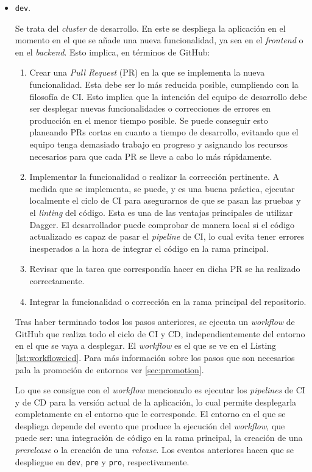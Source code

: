 \begin{itemize}
  \item \texttt{dev}.

    Se trata del \textit{cluster} de desarrollo. En este se despliega la aplicación en el momento en el que se añade una nueva funcionalidad, ya sea en el \textit{frontend} o en el \textit{backend}. Esto implica, en términos de GitHub:

    \begin{enumerate}
      \item Crear una \textit{Pull Request} (PR) en la que se implementa la nueva funcionalidad. Esta debe ser lo más reducida posible, cumpliendo con la filosofía de CI. Esto implica que la intención del equipo de desarrollo debe ser desplegar nuevas funcionalidades o correcciones de errores en producción en el menor tiempo posible. Se puede conseguir esto planeando PRs cortas en cuanto a tiempo de desarrollo, evitando que el equipo tenga demasiado trabajo en progreso y asignando los recursos necesarios para que cada PR se lleve a cabo lo más rápidamente\cite{linear}.
      \item Implementar la funcionalidad o realizar la corrección pertinente. A medida que se implementa, se puede, y es una buena práctica, ejecutar localmente el ciclo de CI para asegurarnos de que se pasan las pruebas y el \textit{linting} del código. Esta es una de las ventajas principales de utilizar Dagger. El desarrollador puede comprobar de manera local si el código actualizado es capaz de pasar el \textit{pipeline} de CI, lo cual evita tener errores inesperados a la hora de integrar el código en la rama principal.
      \item Revisar que la tarea que correspondía hacer en dicha PR se ha realizado correctamente.
      \item Integrar la funcionalidad o corrección en la rama principal del repositorio.
    \end{enumerate}

    Tras haber terminado todos los pasos anteriores, se ejecuta un \textit{workflow} de GitHub que realiza todo el ciclo de CI y CD, independientemente del entorno en el que se vaya a desplegar. El \textit{workflow} es el que se ve en el Listing \ref{lst:workflowcicd}. Para más información sobre los pasos que son necesarios pala la promoción de entornos ver \ref{sec:promotion}. 

    Lo que se consigue con el \textit{workflow} mencionado es ejecutar los \textit{pipelines} de CI y de CD para la versión actual de la aplicación, lo cual permite desplegarla completamente en el entorno que le corresponde. El entorno en el que se despliega depende del evento que produce la ejecución del \textit{workflow}, que puede ser: una integración de código en la rama principal, la creación de una \textit{prerelease} o la creación de una \textit{release}. Los eventos anteriores hacen que se despliegue en \texttt{dev}, \texttt{pre} y \texttt{pro}, respectivamente.


\end{itemize}
